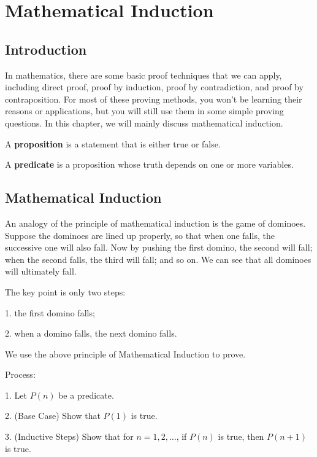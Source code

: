 \chapter{Mathematical Induction}

\section{Introduction}

In mathematics, there are some basic proof techniques that we can apply, including direct proof, proof by induction, proof by contradiction, and proof by contraposition. For most of these proving methods, you won't be learning their reasons or applications, but you will still use them in some simple proving questions. In this chapter, we will mainly discuss mathematical induction.

\begin{definition}[Proposition]
  A \textbf{proposition} is a statement that is either true or false. 
\end{definition}

\begin{definition}[Predicate]
  A \textbf{predicate} is a proposition whose truth depends on one or more variables.
\end{definition}

\section{Mathematical Induction}

An analogy of the principle of mathematical induction is the game of dominoes. Suppose the dominoes are lined up properly, so that when one falls, the successive one will also fall. Now by pushing the first domino, the second will fall; when the second falls, the third will fall; and so on. We can see that all dominoes will ultimately fall.

The key point is only two steps:

1. the first domino falls;

2. when a domino falls, the next domino falls.

We use the above principle of Mathematical Induction to prove. 

Process:

1. Let \(P(n)\) be a predicate.

2. (Base Case) Show that \(P(1)\) is true.

3. (Inductive Steps) Show that for \(n = 1, 2, \dots\), if \(P(n)\) is true, then \(P(n+1)\) is true.

